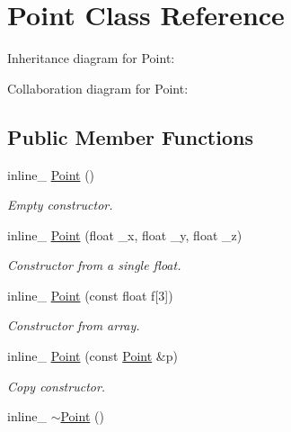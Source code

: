 \hypertarget{class_point}{\section{Point Class Reference}
\label{class_point}
}


Inheritance diagram for Point\+:


Collaboration diagram for Point\+:
\subsection*{Public Member Functions}
\begin{DoxyCompactItemize}
\item 
\hypertarget{class_point_a3f3c6aaaaf8bb929e1dfe870e6b7a6b2}{inline\+\_\+ \hyperlink{class_point_a3f3c6aaaaf8bb929e1dfe870e6b7a6b2}{Point} ()}\label{class_point_a3f3c6aaaaf8bb929e1dfe870e6b7a6b2}

\begin{DoxyCompactList}\small\item\em Empty constructor. \end{DoxyCompactList}\item 
inline\+\_\+ \hyperlink{class_point_ad1a439c6c64387683afd647cba78bc62}{Point} (float \+\_\+x, float \+\_\+y, float \+\_\+z)
\begin{DoxyCompactList}\small\item\em Constructor from a single float. \end{DoxyCompactList}\item 
\hypertarget{class_point_a168adb38b31f5c7527dbfb3ad003dc3c}{inline\+\_\+ \hyperlink{class_point_a168adb38b31f5c7527dbfb3ad003dc3c}{Point} (const float f\mbox{[}3\mbox{]})}\label{class_point_a168adb38b31f5c7527dbfb3ad003dc3c}

\begin{DoxyCompactList}\small\item\em Constructor from array. \end{DoxyCompactList}\item 
\hypertarget{class_point_a0dafe63b549ef952e7fd043f2506a4e6}{inline\+\_\+ \hyperlink{class_point_a0dafe63b549ef952e7fd043f2506a4e6}{Point} (const \hyperlink{class_point}{Point} \&p)}\label{class_point_a0dafe63b549ef952e7fd043f2506a4e6}

\begin{DoxyCompactList}\small\item\em Copy constructor. \end{DoxyCompactList}\item 
\hypertarget{class_point_a4fe2294903b5b3fc374dd640507a4793}{inline\+\_\+ \hyperlink{class_point_a4fe2294903b5b3fc374dd640507a4793}{$\sim$\+Point} ()}\label{class_point_a4fe2294903b5b3fc374dd640507a4793}


\end{DoxyCompactItemize}
